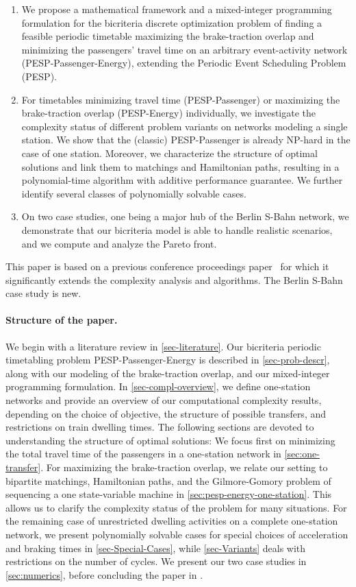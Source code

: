 \documentclass[11pt,a4paper]{article}
\newcommand{\pesp}{PESP\xspace}
\newcommand{\pesppassenger}{PESP-Passenger\xspace}
\newcommand{\pespenergy}{PESP-Energy\xspace}
\newcommand{\pesppassenergy}{PESP-Passenger-Energy\xspace}
\theoremstyle{definition}
\theoremstyle{remark}
\begin{document}
\begin{enumerate}
	\item We propose a mathematical framework and a mixed-integer programming formulation for the bicriteria discrete optimization problem of finding a feasible periodic timetable maximizing the brake-traction overlap and minimizing the passengers' travel time on an arbitrary event-activity network (\pesppassenergy), extending the Periodic Event Scheduling Problem (\pesp).
    \item For timetables minimizing travel time (\pesppassenger) or maximizing the brake-traction overlap (\pespenergy) individually, we investigate the complexity status of different problem variants on networks modeling a single station. We show that the (classic) PESP-Passenger is already NP-hard in the case of one station. Moreover, we characterize the structure of optimal solutions and link them to matchings and Hamiltonian paths, resulting in a polynomial-time algorithm with additive performance guarantee. We further identify several classes of polynomially solvable cases.
    \item On two case studies, one being a major hub of the Berlin S-Bahn network, we demonstrate that our bicriteria model is able to handle realistic scenarios, and we compute and analyze the Pareto front.
\end{enumerate}

This paper is based on a previous conference proceedings paper~\cite{atmos} for which it significantly extends the complexity analysis and algorithms. The Berlin S-Bahn case study is new.



\paragraph*{Structure of the paper.}
We begin with a literature review in \cref{sec-literature}. Our bicriteria periodic timetabling problem \pesppassenergy is described in \cref{sec-prob-descr}, along with our modeling of the brake-traction overlap, and our mixed-integer programming formulation. In \cref{sec-compl-overview}, we define one-station networks and provide an overview of our computational complexity results, depending on the choice of objective, the structure of possible transfers, and restrictions on train dwelling times. The following sections are devoted to understanding the structure of optimal solutions: 
We focus first on minimizing the total travel time of the passengers in a one-station network in \cref{sec:one-transfer}. For maximizing the brake-traction overlap, we relate our setting to bipartite matchings, Hamiltonian paths, and the Gilmore-Gomory problem of sequencing a one state-variable machine in \cref{sec:pesp-energy-one-station}. This allows us to clarify the complexity status of the problem for many situations. For the remaining case of unrestricted dwelling activities on a complete one-station network, we present polynomially solvable cases for special choices of acceleration and braking times in \cref{sec-Special-Cases}, while \cref{sec-Variants} deals with restrictions on the number of cycles. We present our two case studies in \cref{sec:numerics}, before concluding the paper in .
\end{document}
